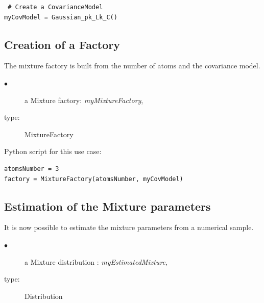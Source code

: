 \begin{lstlisting}
 # Create a CovarianceModel
myCovModel = Gaussian_pk_Lk_C()
\end{lstlisting}


\subsection{Creation of a Factory} %

The mixture factory is built from the number of atoms and the covariance model.

{
  \begin{description}
  \item[$\bullet$] a Mixture factory: {\itshape myMixtureFactory},
  \item[type:] MixtureFactory
  \end{description}
}

\espace
Python script for this use case:

\begin{lstlisting}
atomsNumber = 3
factory = MixtureFactory(atomsNumber, myCovModel)
\end{lstlisting}

\subsection{Estimation of the Mixture parameters}

It is now possible to estimate the mixture parameters from a numerical sample.

{
  \begin{description}
  \item[$\bullet$] a Mixture distribution : {\itshape myEstimatedMixture},
  \item[type:] Distribution
  \end{description}
}
\espace

